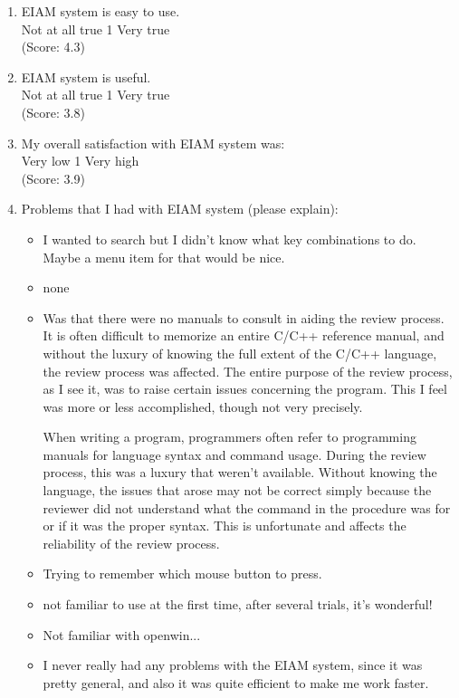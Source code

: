 \begin{enumerate}
\item  EIAM system is easy to use.
\\
Not at all true \hfill 1     \hfill Very true\\
(Score: 4.3)

\item  EIAM system is useful. 
\\
Not at all true \hfill 1     \hfill Very true\\
(Score: 3.8)

\item  My overall satisfaction with EIAM system was:
\\
Very low \hfill 1     \hfill Very high\\
(Score: 3.9)

\item  Problems that I had with EIAM system (please explain): 
\begin{itemize}
\item I wanted to search but I didn't know what key combinations to do.
Maybe a menu item for that would be nice.
\item none
\item Was that there were no manuals to consult in aiding the review
process.  It is often difficult to memorize an entire C/C++
reference manual, and without the luxury of knowing the full extent of
the C/C++ language, the review process was affected.  The entire
purpose of the review process, as I see it, was to raise certain
issues concerning the program.  This I feel was more or less
accomplished, though not very precisely.

When writing a program, programmers often refer to programming manuals
for language syntax and command usage.  During the review process,
this was a luxury that weren't available.  Without knowing the
language, the issues that arose may not be correct simply because the
reviewer did not understand what the command in the procedure was for
or if it was the proper syntax.  This is unfortunate and affects the
reliability of the review process.


\item Trying to remember which mouse button to press.
\item  not familiar to use at the first time, after several trials, it's
 wonderful!

\item Not familiar with openwin...
\item I never really had any problems with the EIAM system, since it was
pretty general, and also it was quite efficient to make me work
faster.


\end{itemize}
\end{enumerate}
